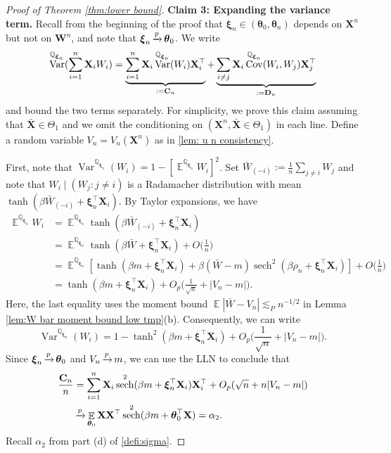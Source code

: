 \documentclass[preprint,reqno]{imsart}
\newcommand{\ttheta}{\boldsymbol{\theta}}
\DeclareMathOperator{\xp}{\xrightarrow{\mathnormal p}}
\DeclareMathOperator{\sech}{sech}
\DeclareMathOperator{\EE}{\mathbb{E}}
\DeclareMathOperator{\Var}{Var}
\DeclareMathOperator{\Cov}{Cov}
\DeclareMathOperator{\QQ}{\mathbb{Q}}
\newcommand{\W}{\mathbf{W}}
\newcommand{\X}{\mathbf{X}}
\newcommand{\xxi}{\boldsymbol \xi}
\DeclareMathOperator{\sumin}{\sum_{\mathnormal i=1}^{\mathnormal n}}
\begin{document}
\begin{appendix}
\begin{proof}[Proof of Theorem \ref{thm:lower bound}]
\vspace{2mm}
\textbf{Claim 3: Expanding the variance term.}
%
Recall from the beginning of the proof that $\xxi_n \in (\ttheta_0, \ttheta_n)$ depends on $\X^n$ but not on $\W^n$, and note that $\xxi_n \xp \ttheta_0$.
%
%
We write
$$\Var^{\QQ_{\xxi_n}}(\sumin \X_i W_i) = \underbrace{\sumin \X_i \Var^{\QQ_{\xxi_n}} (W_i) \X_i^\top}_{:= \mathbf{C}_n} + \underbrace{\sum_{i \neq j} \X_i \Cov^{\QQ_{\xxi_n}} (W_i, W_j) \X_j^\top }_{:=\mathbf{D}_n}$$
and bound the two terms separately. For simplicity, we prove this claim assuming that $\bar{\X} \in \Theta_1$ and we omit the conditioning on $(\X^n, \bar{\X} \in \Theta_1)$ in each line. Define a random variable $V_n = V_n(\X^n)$ as in \cref{lem: u n consistency}.

First, note that $\Var^{\QQ_{\xxi_n}} (W_i) = 1 - \left[\EE^{\QQ_{\xxi_n}} W_i \right]^2$. Set $\bar{W}_{(-i)} := \frac{1}{n} \sum_{j \neq i} W_j$ and note that $W_i \mid (W_j : j \neq i)$ is a Radamacher distribution with mean $\tanh(\beta \bar{W}_{(-i)} + \xxi_n^\top \X_i)$. By Taylor expansions, we have
\begin{align*}
    \EE^{\QQ_{\xxi_n}} W_i &= \EE^{\QQ_{\xxi_n}} \tanh(\beta \bar{W}_{(-i)} + \xxi_n^\top \X_i) \\
    &= \EE^{\QQ_{\xxi_n}} \tanh(\beta \bar{W} + \xxi_n^\top \X_i) + O\Big(\frac{1}{n}\Big) \\
    &= \EE^{\QQ_{\xxi_n}} \left[ \tanh(\beta m + \xxi_n^\top \X_i) + \beta(\bar{W} - m) \sech^2(\beta \rho_n + \xxi_n^\top \X_i)\right]+ O\Big(\frac{1}{n}\Big) \\
    &= \tanh(\beta m + \xxi_n^\top \X_i) + O_p\Big(\frac{1}{\sqrt{n}} + |V_n - m| \Big).
\end{align*}
%
%
Here, the last equality uses the moment bound $\EE|\bar{W}-V_n| \lesssim_P n^{-1/2}$ in Lemma \ref{lem:W bar moment bound low tmp}(b).
Consequently, we can write
$$\Var^{\QQ_{\xxi_n}} (W_i) = 1 - \tanh^2(\beta m + \xxi_n^\top \X_i) + O_p\Big(\frac{1}{\sqrt{n}} + |V_n - m| \Big).$$
%
%
%
%
Since $\xxi_n \xp \ttheta_0$ and $V_n \xp m$, we can use the LLN to conclude that
\begin{align}\label{eq:lower bound variance A_n}
    \frac{\mathbf{C}_n}{n} &= \sumin \X_i \sech^2(\beta m + \xxi_n^\top \X_i) \X_i^\top + O_p(\sqrt{n} + n|V_n-m|) \\
    &\xp \EE_{\ttheta_0} \X \X^\top \sech^2(\beta m + \ttheta_0^\top \X) = \alpha_2. \notag
\end{align}
Recall $\alpha_2$ from part (d) of \cref{defi:sigma}.


\end{proof}
\end{appendix}
\end{document}
